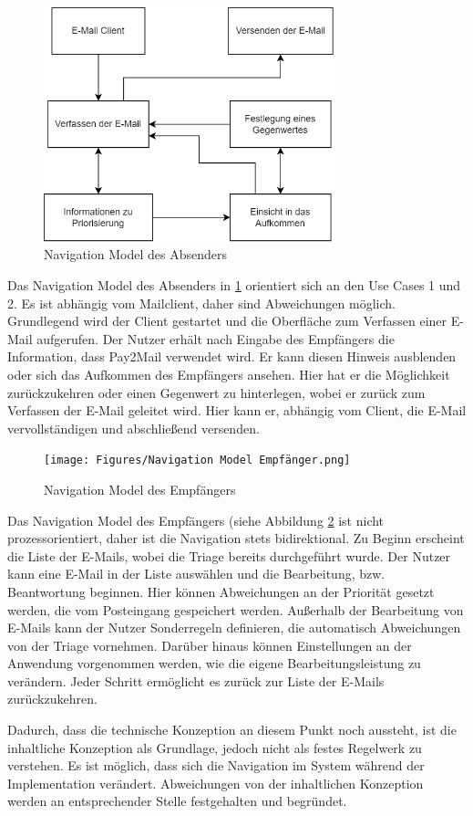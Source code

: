 \begin{figure}[!ht]
	\centering
		\includegraphics[width=0.75\textwidth]{Figures/Navigation Model Absender.png}
	\caption{Navigation Model des Absenders}
	\label{fig:navigation_model_absender}
\end{figure}

\noindent Das Navigation Model des Absenders in \ref{fig:navigation_model_absender} orientiert sich an den Use Cases 1 und 2. Es ist abhängig vom Mailclient, daher sind Abweichungen möglich. Grundlegend wird der Client gestartet und die Oberfläche zum Verfassen einer E-Mail aufgerufen. Der Nutzer erhält nach Eingabe des Empfängers die Information, dass Pay2Mail verwendet wird. Er kann diesen Hinweis ausblenden oder sich das Aufkommen des Empfängers ansehen. Hier hat er die Möglichkeit zurückzukehren oder einen Gegenwert zu hinterlegen, wobei er zurück zum Verfassen der E-Mail geleitet wird. Hier kann er, abhängig vom Client, die E-Mail vervollständigen und abschließend versenden.

\begin{figure}[!ht]
	\centering
		\texttt{[image: Figures/Navigation Model Empfänger.png]}
	\caption{Navigation Model des Empfängers}
	\label{fig:navigation_model_empfaenger}
\end{figure}

Das Navigation Model des Empfängers (siehe Abbildung \ref{fig:navigation_model_empfaenger} ist nicht prozessorientiert, daher ist die Navigation stets bidirektional. Zu Beginn erscheint die Liste der E-Mails, wobei die Triage bereits durchgeführt wurde. Der Nutzer kann eine E-Mail in der Liste auswählen und die Bearbeitung, bzw. Beantwortung beginnen. Hier können Abweichungen an der Priorität gesetzt werden, die vom Posteingang gespeichert werden. Außerhalb der Bearbeitung von E-Mails kann der Nutzer Sonderregeln definieren, die automatisch Abweichungen von der Triage vornehmen. Darüber hinaus können Einstellungen an der Anwendung vorgenommen werden, wie die eigene Bearbeitungsleistung zu verändern. Jeder Schritt ermöglicht es zurück zur Liste der E-Mails zurückzukehren.

Dadurch, dass die technische Konzeption an diesem Punkt noch aussteht, ist die inhaltliche Konzeption als Grundlage, jedoch nicht als festes Regelwerk zu verstehen. Es ist möglich, dass sich die Navigation im System während der Implementation verändert. Abweichungen von der inhaltlichen Konzeption werden an entsprechender Stelle festgehalten und begründet.